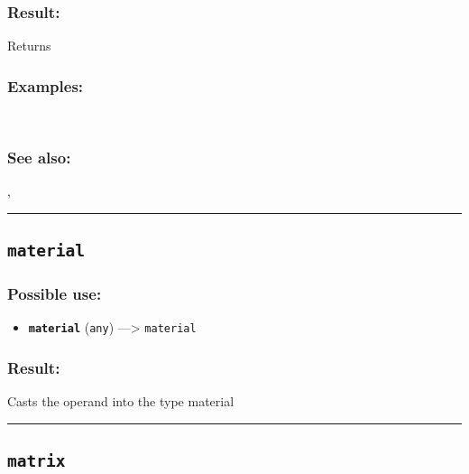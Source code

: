 \documentclass[]{book}
\providecommand{\tightlist}{%
  \setlength{\itemsep}{0pt}\setlength{\parskip}{0pt}}
\theoremstyle{definition}
\theoremstyle{definition}
\theoremstyle{definition}
\theoremstyle{remark}
\begin{document}
\subsubsection{Result:}\label{result-324}

Returns

\subsubsection{Examples:}\label{examples-232}

\begin{verbatim}
 
\end{verbatim}

\subsubsection{See also:}\label{see-also-132}

\href{operators-s-to-z.html\#}{},

\begin{center}\rule{0.5\linewidth}{\linethickness}\end{center}

\subsection{\texorpdfstring{\texttt{material}}{material}}\label{material-1}

\subsubsection{Possible use:}\label{possible-use-336}

\begin{itemize}
\tightlist
\item
  \textbf{\texttt{material}} (\texttt{any}) ---\textgreater{}
  \texttt{material}
\end{itemize}

\subsubsection{Result:}\label{result-325}

Casts the operand into the type material

\begin{center}\rule{0.5\linewidth}{\linethickness}\end{center}

\subsection{\texorpdfstring{\texttt{matrix}}{matrix}}\label{matrix}
\end{document}
